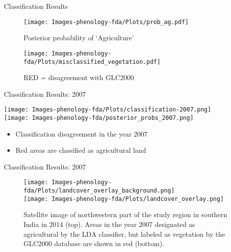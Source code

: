 \documentclass{beamer}
\begin{document}
\begin{frame}{Classification Results}
	\begin{minipage}{0.45\textwidth}
		\begin{figure}
		\texttt{[image: Images-phenology-fda/Plots/prob\_ag.pdf]}
		\caption{Posterior probability of `Agriculture'}
		\end{figure}
	\end{minipage}
	\begin{minipage}{0.45\textwidth}
		\begin{figure}
		\texttt{[image: Images-phenology-fda/Plots/misclassified\_vegetation.pdf]}
		\caption{RED = disagreement with GLC2000}
		\end{figure}
	\end{minipage}
\end{frame}


\begin{frame}[t]{Classification Results: 2007}
	\begin{minipage}{.4\textwidth}
	\texttt{[image: Images-phenology-fda/Plots/classification-2007.png]}\\
	\texttt{[image: Images-phenology-fda/posterior\_probs\_2007.png]}
	\end{minipage}
	\begin{minipage}{.5\textwidth}
	 \begin{itemize}
	 	\item Classification disagreement in the year 2007
		\item Red areas are classified as agricultural land 
	 \end{itemize}
	\end{minipage}
\end{frame}

\begin{frame}[t]{Classification Results: 2007}
	\begin{figure}
		[htbp] \centering 
		\texttt{[image: Images-phenology-fda/Plots/landcover\_overlay\_background.png]} \\[0.1cm]
		\texttt{[image: Images-phenology-fda/Plots/landcover\_overlay.png]} \\
		\caption{Satellite image of northwestern part of the study region in southern India in 2014 (top). Areas in the year 2007 designated as agricultural by the LDA classifier, but labeled as vegetation by the GLC2000 database are shown in red (bottom).} 
	\end{figure}
	
\end{frame}
\end{document}
